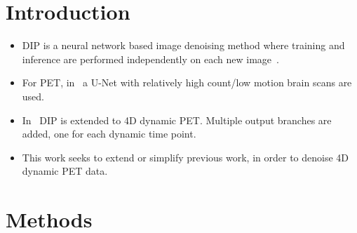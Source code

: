 \documentclass[portrait, color=UCLburgundy, margin=1cm]{uclposter}
\begin{document}
    \begin{multicols}{2}
        \section*{Introduction}
            \begin{highlightbox}[UCLlightgreen]
                \begin{itemize}
                    \item \gls{DIP} is a neural network based image denoising method where training and inference are performed independently on each new image~\cite{Ulyanov2018DeepPrior}.
                    \item For \acrshort{PET}, in~\cite{Gong2019PETPrior} a U-Net with relatively high count/low motion brain scans are used.
                    \item In~\cite{Hashimoto20214DNetwork} \gls{DIP} is extended to \acrshort{4D} dynamic \acrshort{PET}. Multiple output branches are added, one for each dynamic time point.
                    \item This work seeks to extend or simplify previous work, in order to denoise \acrshort{4D} dynamic \acrshort{PET} data.
                \end{itemize}
            \end{highlightbox}
        
        \section*{Methods}

\end{multicols}
\end{document}
